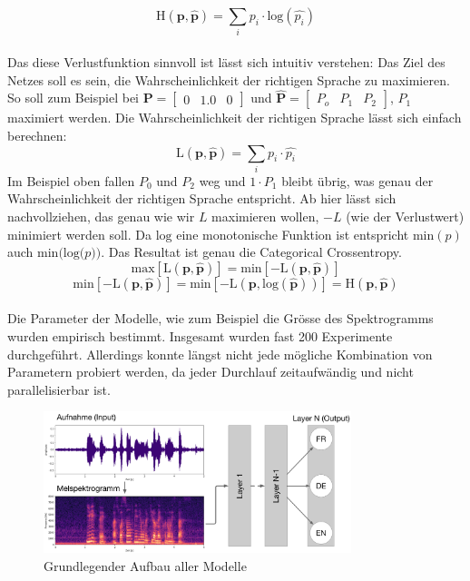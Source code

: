 $$\text{H}(\boldsymbol{p}, \hat{\boldsymbol{p}}) = \sum\limits_{i} p_i \cdot \text{log}(\hat{p_i})$$
\\
Das diese Verlustfunktion sinnvoll ist lässt sich intuitiv verstehen: Das Ziel des Netzes soll es sein, die Wahrscheinlichkeit der richtigen Sprache zu maximieren. So soll zum Beispiel bei $\boldsymbol{P}=\begin{bmatrix} 0 & 1.0 & 0\end{bmatrix}$ und $\boldsymbol{\hat{P}}=\begin{bmatrix} P_o & P_1 & P_2\end{bmatrix}$,  $ P_1$ maximiert werden. Die Wahrscheinlichkeit der richtigen Sprache lässt sich einfach berechnen:
$$\text{L}(\boldsymbol{p}, \hat{\boldsymbol{p}}) = \sum\limits_{i} p_i \cdot \hat{p_i}$$
Im Beispiel oben fallen $P_0$ und $P_2$ weg und $1\cdot P_1$ bleibt übrig, was genau der Wahrscheinlichkeit der richtigen Sprache entspricht. Ab hier lässt sich nachvollziehen, das genau wie wir $L$ maximieren wollen, $-L$ (wie der Verlustwert) minimiert werden soll. Da $\text{log}$ eine monotonische Funktion ist entspricht $\text{min}(p)$ auch $\text{min(log(}p))$. Das Resultat ist genau die Categorical Crossentropy.
$$\text{max}[\text{L}(\boldsymbol{p}, \hat{\boldsymbol{p}})] =\text{min}[-\text{L}(\boldsymbol{p}, \hat{\boldsymbol{p}})]$$
$$\text{min}[-\text{L}(\boldsymbol{p}, \hat{\boldsymbol{p}})] =\text{min}[-\text{L}(\boldsymbol{p}, \text{log}(\boldsymbol{\hat{p}}))] = \text{H}(\boldsymbol{p}, \hat{\boldsymbol{p}})$$
\\
Die Parameter der Modelle, wie zum Beispiel die Grösse des Spektrogramms wurden empirisch bestimmt. Insgesamt wurden fast 200 Experimente durchgeführt. Allerdings konnte längst nicht jede mögliche Kombination von Parametern probiert werden, da jeder Durchlauf zeitaufwändig und nicht parallelisierbar ist.
\begin{figure}[hbt]
	\centering
		\includegraphics[width=0.8\textwidth]{assets/modelflow.png}
	\caption{Grundlegender Aufbau aller Modelle}
	\label{img:workflow}
\end{figure}


